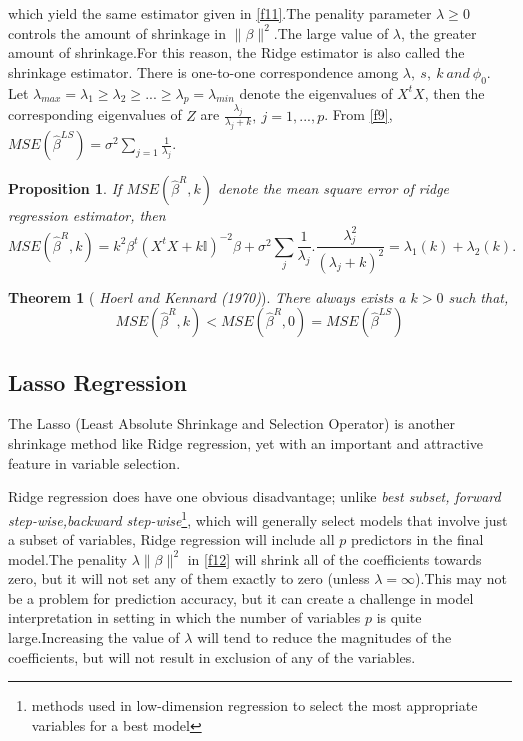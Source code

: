 \documentclass[12pt]{report}
\renewcommand{\emph}{\textit}
\newtheorem{theoreme}{Theorem}[section] %
\newtheorem {proposition}{Proposition}[section]  %
\begin{document}
which yield the same estimator given in \eqref{f11}.The penality parameter $\lambda \geq 0$ controls the amount of shrinkage in $\parallel \beta \parallel^{2}$.The large value of $\lambda$, the greater amount of shrinkage.For this reason, the Ridge estimator is also called the shrinkage estimator. There is one-to-one correspondence among $\lambda,\ s,\ k\ and\ \phi_{0}$.\\
	Let $\lambda_{max} = \lambda_{1} \geq \lambda_{2} \geq...\geq \lambda_{p}=\lambda_{min}$ denote the eigenvalues of $X^{t}X$, then the corresponding eigenvalues of $Z$ are $\frac{\lambda_{j}}{\lambda_{j} + k},\ j=1,...,p$. From \eqref{f9}, $MSE(\hat{\beta}^{LS})=\sigma^{2}\sum_{j=1}\frac{1}{\lambda_{j}}$.
\begin{proposition}
	If $MSE(\hat{\beta}^{R},k)$ denote the mean square error of ridge regression estimator, then 
	\begin{equation}
		MSE(\hat{\beta}^{R},k)=k^{2}\beta^{t}(X^{t}X+k\mathbb{I})^{-2}\beta +\sigma^{2}\sum_{j}\frac{1}{\lambda_{j}} .	\frac{\lambda_{j}^{2}}{(\lambda_{j}+k)^{2}}=\lambda_{1}(k)+\lambda_{2}(k).
		\label{f17}
	\end{equation}
\end{proposition}
	\begin{theoreme}[ \emph{Hoerl and Kennard (1970)}]
	There always exists a $k > 0$ such that, 
	$$MSE(\hat{\beta}^{R},k)<MSE(\hat{\beta}^{R},0)=MSE(\hat{\beta}^{LS})$$
\end{theoreme}
	\subsection{Lasso Regression}
The Lasso (Least Absolute Shrinkage and Selection Operator) is another shrinkage method like Ridge regression, yet with an important and attractive feature in variable selection.

Ridge regression does have one obvious disadvantage; unlike \emph{best subset, forward step-wise,backward step-wise}\footnote{methods used in low-dimension regression to select the most appropriate variables for a best model}, which will generally select models that involve just a subset of variables, Ridge regression will include all $p$ predictors in the final model.The penality $\lambda\parallel \beta \parallel^{2}$  in \eqref{f12} will shrink all of the coefficients towards zero, but it will not set any of them exactly to zero (unless $\lambda=\infty$).This may not be a problem for prediction accuracy, but it can create a challenge in model interpretation in setting in which the number of variables $p$ is quite large.Increasing the value of $\lambda$ will tend to reduce the magnitudes of the coefficients, but will not result in exclusion of any of the variables.
\end{document}
